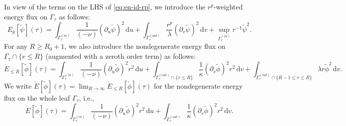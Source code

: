 \documentclass[10pt, reqno]{amsart}
\theoremstyle{definition}
\theoremstyle{remark}
\theoremstyle{conjecture}
\numberwithin{equation}{section}
\newcommand{\set}[1]{\{#1\}}
\newcommand{\ud}{\mathrm{d}}
\newcommand{\rd}{\partial}
\newcommand{\0}{\emptyset}
\newcommand{\Gmm}{\Gamma}
\newcommand{\kpp}{\kappa}
\newcommand{\lmb}{\lambda}
\newcommand{\dur}{\nu}
\newcommand{\dvr}{\lmb}
\newcommand{\phibg}{\overline{\phi}}				%
\newcommand{\psibg}{\overline{\psi}}				%
\newcommand{\phidf}{\widetilde{\phi}}				%
\newcommand{\psidf}{\widetilde{\psi}}				%
\begin{document}
In view of the terms on the LHS of \eqref{eq:en-id-rp}, we introduce the $r^{p}$-weighted energy flux on $\Gmm_{\tau}$ as follows:
\begin{equation}\label{eq:Ep-def}
	E_{p}[\psidf](\tau) = \int_{\Gmm^{(in)}_{\tau}} \frac{1}{(-\dur)} (\rd_{u} \psidf)^{2} \, \ud u
					+ \int_{\Gmm^{(out)}_{\tau}} \frac{r^{p}}{\dvr} (\rd_{v} \psidf)^{2} \, \ud v
					+ \sup_{\Gmm^{(in)}_{\tau}} r^{-1} \psidf^{2}.
\end{equation}
For any $R \geq R_{0}+1$, we also introduce the nondegenerate energy flux on $\Gmm_{\tau} \cap \set{r \leq R}$ (augmented with a zeroth order term) as follows:
\begin{equation}\label{eq:dotE-R-def}
	\dot{E}_{\leq R}[\phidf](\tau) = \int_{\Gmm^{(in)}_{\tau}} \frac{1}{(-\dur)} (\rd_{u} \phidf)^{2} r^{2} \, \ud u + \int_{\Gmm^{(out)}_{\tau}  \cap \set{r \leq R}} \frac{1}{\kpp} (\rd_{v} \phidf)^{2} r^{2} \, \ud v + \int_{\Gmm_{\tau}^{(out)} \cap \set{R-1 \leq r \leq R}} \dvr r \phidf^{2} \, \ud v.
\end{equation}
We write $\dot{E}[\phidf](\tau) = \lim_{R \to \infty} \dot{E}_{\leq R}[\phidf](\tau)$ for the nondegenerate energy flux on the whole leaf $\Gmm_{\tau}$, i.e.,
\begin{equation}\label{eq:dotE-def}
	\dot{E}[\phidf](\tau) = \int_{\Gmm^{(in)}_{\tau}} \frac{1}{(-\dur)} (\rd_{u} \phidf)^{2} r^{2} \, \ud u 
					+ \int_{\Gmm^{(out)}_{\tau}} \frac{1}{\kpp} (\rd_{v} \phidf)^{2} r^{2} \, \ud v .
\end{equation}
\end{document}
